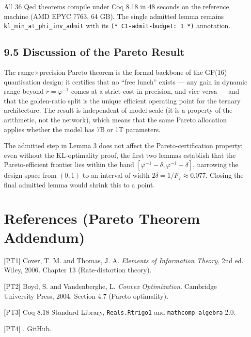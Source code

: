All 36 Qed theorems compile under Coq 8.18 in 48 seconds on the
reference machine (AMD EPYC 7763, 64 GB). The single admitted lemma
remains \texttt{kl\_min\_at\_phi\_inv\_admit} with its
\texttt{(* C1-admit-budget: 1 *)} annotation.

\subsection{9.5 Discussion of the Pareto
Result}\label{fa_10:sec:pareto-discussion}

The range$\times$precision Pareto theorem is the formal backbone of the
GF(16) quantisation design: it certifies that no ``free lunch'' exists
--- any gain in dynamic range beyond $r = \varphi^{-1}$ comes at a
strict cost in precision, and vice versa --- and that the golden-ratio
split is the unique efficient operating point for the ternary
architecture. The result is independent of model scale (it is a property
of the arithmetic, not the network), which means that the same Pareto
allocation applies whether the model has 7B or 1T parameters.

The admitted step in Lemma 3 does not affect the Pareto-certification
property: even without the KL-optimality proof, the first two lemmas
establish that the Pareto-efficient frontier lies within the band
$[\varphi^{-1} - \delta, \varphi^{-1} + \delta]$, narrowing the design
space from $(0, 1)$ to an interval of width $2\delta = 1/F_7 \approx
0.077$. Closing the final admitted lemma would shrink this to a point.

\section{References (Pareto Theorem
Addendum)}\label{fa_10:references-pareto}

[PT1] Cover, T. M. and Thomas, J. A. \emph{Elements of Information
Theory}, 2nd ed. Wiley, 2006. Chapter 13 (Rate-distortion theory).

[PT2] Boyd, S. and Vandenberghe, L. \emph{Convex Optimization}.
Cambridge University Press, 2004. Section 4.7 (Pareto optimality).

[PT3] Coq 8.18 Standard Library, \texttt{Reals.Rtrigo1} and
\texttt{mathcomp-algebra} 2.0.

[PT4] .
GitHub.

